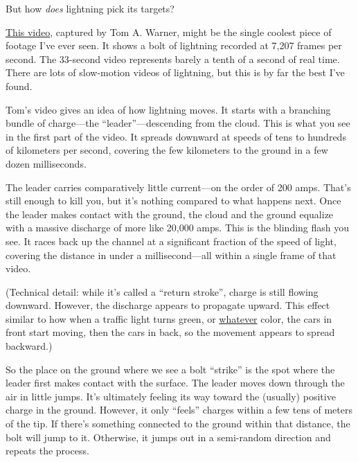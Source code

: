 {But how \emph{does} lightning pick its targets?}

{ \href{http://www.youtube.com/watch?v=\_1mB5rM8WHU}{This video}, captured by Tom A. Warner, might be the single coolest piece of footage I’ve ever seen. It shows a bolt of lightning recorded at 7,207 frames per second. The 33-second video represents barely a tenth of a second of real time. There are lots of slow-motion videos of lightning, but this is by far the best I’ve found.}

{Tom’s video gives an idea of how lightning moves. It starts with a branching bundle of charge—the “leader”—descending from the cloud. This is what you see in the first part of the video. It spreads downward at speeds of tens to hundreds of kilometers per second, covering the few kilometers to the ground in a few dozen milliseconds.}

{The leader carries comparatively little current—on the order of 200 amps. That’s still enough to kill you, but it’s nothing compared to what happens next. Once the leader makes contact with the ground, the cloud and the ground equalize with a massive discharge of more like 20,000 amps. This is the blinding flash you see. It races back up the channel at a significant fraction of the speed of light, covering the distance in under a millisecond—all within a single frame of that video.}

{(Technical detail: while it’s called a “return stroke”, charge is still flowing downward. However, the discharge appears to propagate upward. This effect similar to how when a traffic light turns green, or \href{http://xkcd.com/1116/}{whatever} color, the cars in front start moving, then the cars in back, so the movement appears to spread backward.)}

{So the place on the ground where we see a bolt “strike” is the spot where the leader first makes contact with the surface. The leader moves down through the air in little jumps. It’s ultimately feeling its way toward the (usually) positive charge in the ground. However, it only “feels” charges within a few tens of meters of the tip. If there’s something connected to the ground within that distance, the bolt will jump to it. Otherwise, it jumps out in a semi-random direction and repeats the process.}

